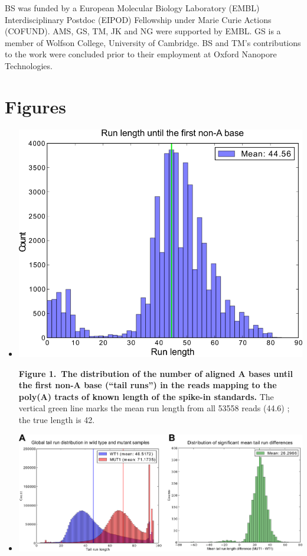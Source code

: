 \documentclass[10pt]{article}
\begin{document}
BS was funded by a European Molecular Biology Laboratory (EMBL) Interdisciplinary Postdoc (\mbox{EIPOD}) Fellowship under Marie Curie Actions (COFUND). AMS, GS, TM, JK and NG were supported by EMBL.  GS is a member of Wolfson College, University of Cambridge.  BS and TM's contributions to the work were concluded prior to their employment at Oxford Nanopore Technologies.


 
\newpage

\section*{Figures}
\vspace{1cm}

\begin{itemize}
\item[]{
\begin{center}
\includegraphics[scale=1.5]{Figure2.png}
\end{center}

\textbf{Figure 1.~The distribution of the number of aligned A bases until the first non-A base (``tail runs'') in the reads mapping to the poly(A) tracts of known length of the spike-in standards.} The vertical green line marks the mean run length from all 53558 reads (44.6) ; the true length is 42.
}
\newpage

\item[]{
\begin{center}
\includegraphics[scale=0.9]{Figure3.png}
\end{center}

}
\end{itemize}
\end{document}
